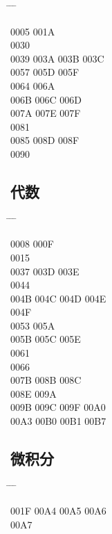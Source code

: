 \documentclass[twoside, twocolumn]{ctexart}
\newenvironment{problist}{
  \begin{center} \ttfamily \begin{tabbing}
      \hspace{50pt} \= \hspace{50pt} \= \hspace{50pt} \= \kill
  }{ \end{tabbing} \end{center} }
\begin{document}
  \begin{problist}
    0005   \> 001A \\ 0030    \\
    0039 \> 003A \> 003B \> 003C \\ 0057  \> 005D \> 005F \\
    0064   \> 006A \\ 006B \> 006C \> 006D  \\
    007A \> 007E \> 007F  \\ 0081    \\
    0085  \> 008D \> 008F \\ 0090   \\
  \end{problist}

  \subsection*{代数}

  \begin{problist}
    0008 \> 000F   \\ 0015    \\
    0037 \> 003D \> 003E  \\ 0044    \\
    004B \> 004C \> 004D \> 004E \\ 004F    \\
    0053   \> 005A \\ 005B \> 005C \> 005E  \\
    0061    \\ 0066    \\
    007B  \> 008B \> 008C \\ 008E   \> 009A \\
    009B \> 009C \> 009F \> 00A0 \\ 00A3 \> 00B0 \> 00B1 \> 00B7 \\
  \end{problist}

  \subsection*{微积分}

  \begin{problist}
    001F \> 00A4 \> 00A5 \> 00A6 \\ 00A7 \\
  \end{problist}
\end{document}
